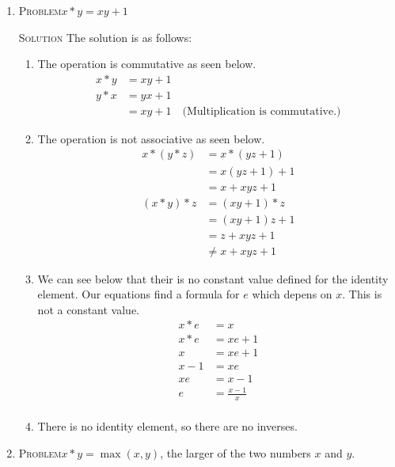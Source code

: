 \documentclass{amsart}
\newcommand{\Solution}{\textsc{Solution}\xspace}
\newcommand{\Problem}{\textsc{Problem}\xspace}
\begin{document}
\begin{enumerate}
   \item \Problem $x*y = xy + 1$

   \noindent \Solution The solution is as follows:

   \begin{enumerate}

      \item The operation is commutative as seen below.
      \begin{align*}
         x * y & = xy + 1  \\
	 y * x & = yx + 1 \\
	       & = xy + 1 \quad\text{(Multiplication is commutative.)}
      \end{align*}

      \item The operation is not associative as seen below.
      \begin{align*}
         x * (y * z) & = x * (yz + 1) \\
	             & = x(yz + 1) + 1 \\
		     & = x + xyz + 1 \\
	 (x * y) * z & = (xy + 1) * z \\
	             & = (xy + 1)z + 1 \\
		     & = z + xyz + 1 \\
		     & \ne x + xyz + 1
      \end{align*}

      \item We can see below that their is no constant value defined for
      the identity element. Our equations find a formula for $e$ which
      depens on $x$. This is not a constant value.
      \begin{align*}
         x * e & = x \\
	 x * e & = xe + 1 \\
	     x & = xe + 1 \\
	 x - 1 & = xe     \\
	 xe    & = x - 1  \\
	  e    & = \frac{x - 1}{x} \\
      \end{align*}

      \item There is no identity element, so there are no inverses.
   \end{enumerate}

   \item \Problem $x * y = \max(x,y)$, the larger of the two numbers $x$ and $y$.


\end{enumerate}
\end{document}

